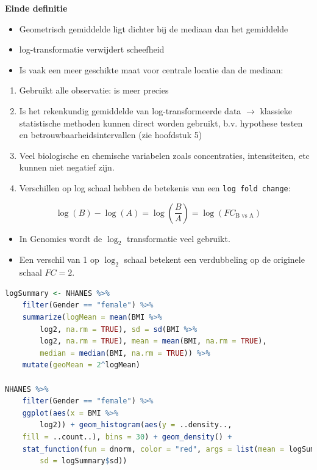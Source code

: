 \documentclass[
  12pt,dutch,coursenotes]{book}
\newcommand{\passthrough}[1]{#1}
\providecommand{\tightlist}{%
  \setlength{\itemsep}{0pt}\setlength{\parskip}{0pt}}
\theoremstyle{definition}
\theoremstyle{definition}
\theoremstyle{definition}
\theoremstyle{definition}
\theoremstyle{remark}
\begin{document}
\textbf{Einde definitie}

\begin{itemize}
\item
  Geometrisch gemiddelde ligt dichter bij de mediaan dan het gemiddelde
\item
  log-transformatie verwijdert scheefheid
\item
  Is vaak een meer geschikte maat voor centrale locatie dan de mediaan:
\end{itemize}

\begin{enumerate}
\def\labelenumi{\arabic{enumi}.}
\tightlist
\item
  Gebruikt alle observatie: is meer precies
\item
  Is het rekenkundig gemiddelde van log-transformeerde data \(\rightarrow\) klassieke statistische methoden kunnen direct worden gebruikt, b.v. hypothese testen en betrouwbaarheidsintervallen (zie hoofdstuk 5)
\item
  Veel biologische en chemische variabelen zoals concentraties, intensiteiten, etc kunnen niet negatief zijn.
\item
  Verschillen op log schaal hebben de betekenis van een \passthrough{\lstinline!log fold change!}:
\end{enumerate}

\[
\log (B) - \log(A)= \log(\frac{B}{A})=\log(FC_\text{B vs A})
\]

\begin{itemize}
\item
  In Genomics wordt de \(\log_2\) transformatie veel gebruikt.
\item
  Een verschil van 1 op \(\log_2\) schaal betekent een verdubbeling op de originele schaal \(FC=2\).
\end{itemize}

\begin{lstlisting}[language=R]
logSummary <- NHANES %>%
    filter(Gender == "female") %>%
    summarize(logMean = mean(BMI %>%
        log2, na.rm = TRUE), sd = sd(BMI %>%
        log2, na.rm = TRUE), mean = mean(BMI, na.rm = TRUE),
        median = median(BMI, na.rm = TRUE)) %>%
    mutate(geoMean = 2^logMean)

NHANES %>%
    filter(Gender == "female") %>%
    ggplot(aes(x = BMI %>%
        log2)) + geom_histogram(aes(y = ..density..,
    fill = ..count..), bins = 30) + geom_density() +
    stat_function(fun = dnorm, color = "red", args = list(mean = logSummary$logMean,
        sd = logSummary$sd))
\end{lstlisting}
\end{document}
